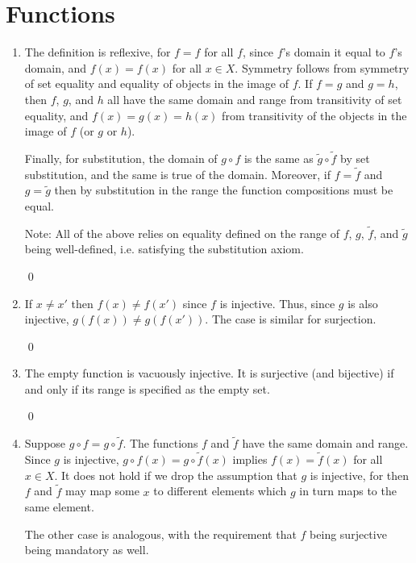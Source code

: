 \section{Functions}
\begin{enumerate}[Ex. 3.3.1.]
    \item The definition is reflexive, for $f = f$ for all $f$, since $f$'s domain
    it equal to $f$'s domain, and $f(x) = f(x)$ for all $x\in X$. Symmetry follows
    from symmetry of set equality and equality of objects in the image of $f$.
    If $f = g$ and $g = h$, then $f$, $g$, and $h$ all have the same domain and
    range from transitivity of set equality, and $f(x) = g(x) = h(x)$ from
    transitivity of the objects in the image of $f$ (or $g$ or $h$).

    Finally, for substitution, the domain of $g\circ f$ is the same as
    $\tilde{g}\circ\tilde{f}$ by set substitution, and the same is true of the domain.
    Moreover, if $f = \tilde{f}$ and $g = \tilde{g}$ then by substitution in the range
    the function compositions must be equal.

    Note: All of the above relies on equality defined on the range of $f$, $g$,
    $\tilde{f}$, and $\tilde{g}$ being well-defined, i.e. satisfying the substitution
    axiom.

    \qed
    
    \item If $x\neq x'$ then $f(x) \neq f(x')$ since $f$ is injective. Thus,
    since $g$ is also injective, $g(f(x)) \neq g(f(x'))$. The case is similar
    for surjection.

    \qed

    \item The empty function is vacuously injective. It is surjective (and bijective) 
    if and only if its range is specified as the empty set.

    \qed

    \item Suppose $g\circ f = g\circ\tilde{f}$. The functions $f$ and $\tilde{f}$
    have the same domain and range.  Since $g$ is injective, 
    $g\circ f(x) = g\circ\tilde{f}(x)$ implies $f(x) = \tilde{f}(x)$ for all $x\in X$.
    It does not hold if we drop the assumption that $g$ is injective, for then
    $f$ and $\tilde{f}$ may map some $x$ to different elements which $g$ in turn
    maps to the same element.

    The other case is analogous, with the requirement that $f$ being surjective
    being mandatory as well.


\end{enumerate}
